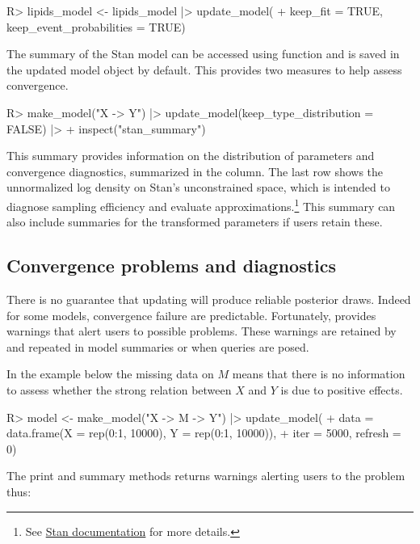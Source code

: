 \documentclass[
  11pt,
  article]{jss}
\renewcommand{\texttt}[1]{\code{#1}}
\begin{document}
\begin{CodeInput}
R> lipids_model <- lipids_model |> update_model(
+    keep_fit = TRUE, keep_event_probabilities = TRUE)
\end{CodeInput}

The summary of the Stan model can be accessed using \texttt{inspect()}
function and is saved in the updated model object by default. This
provides two measures to help assess convergence.

\begin{CodeInput}
R> make_model("X -> Y") |> update_model(keep_type_distribution = FALSE) |>
+    inspect("stan_summary")
\end{CodeInput}

This summary provides information on the distribution of parameters and
convergence diagnostics, summarized in the \texttt{Rhat} column. The
last row shows the unnormalized log density on Stan's unconstrained
space, which is intended to diagnose sampling efficiency and evaluate
approximations.\footnote{See
  \href{https://mc-stan.org/cmdstanr/reference/fit-method-lp.html}{Stan
  documentation} for more details.} This summary can also include
summaries for the transformed parameters if users retain these.

\subsection{Convergence problems and
diagnostics}\label{convergence-problems-and-diagnostics}

There is no guarantee that updating will produce reliable posterior
draws. Indeed for some models, convergence failure are predictable.
Fortunately, \texttt{stan} provides warnings that alert users to
possible problems. These warnings are retained by 
and repeated in model summaries or when queries are posed.

In the example below the missing data on \(M\) means that there is no
information to assess whether the strong relation between \(X\) and
\(Y\) is due to positive effects.

\begin{CodeInput}
R> model <- make_model("X -> M -> Y") |> update_model(
+    data = data.frame(X = rep(0:1, 10000), Y = rep(0:1, 10000)),
+    iter = 5000, refresh = 0)
\end{CodeInput}

The print and summary methods returns warnings alerting users to the
problem thus:
\end{document}
